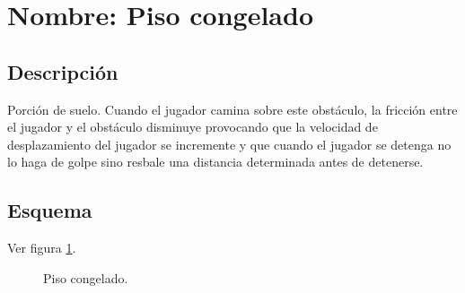 	\section{Nombre: Piso congelado}\label{obs.pisoC}
	\subsection{Descripción}
	Porción de suelo. Cuando el jugador camina sobre este obstáculo, la fricción entre el jugador y el obstáculo disminuye provocando que la velocidad de desplazamiento del jugador se incremente y que cuando el jugador se detenga no lo haga de golpe sino resbale una distancia determinada antes de detenerse.
	\subsection{Esquema}
Ver figura \ref{fig:pisoC}.
	\begin{figure}
  \centering
  \caption{Piso congelado.}
  \label{fig:pisoC}
\end{figure} 